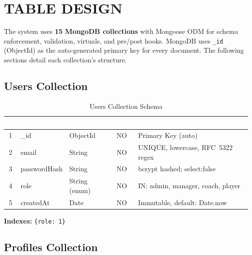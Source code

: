 \documentclass[12pt,a4paper,oneside]{report}
\begin{document}
\chapter{TABLE DESIGN}

The system uses \textbf{15 MongoDB collections} with Mongoose ODM for schema enforcement, validation, virtuals, and pre/post hooks. MongoDB uses \texttt{\_id} (ObjectId) as the auto-generated primary key for every document. The following sections detail each collection's structure.

\section{Users Collection}

\begin{table}[H]
\centering
\caption{Users Collection Schema}
\label{tab:users}
\small
\begin{tabularx}{\textwidth}{|c|l|l|l|X|}
\hline
\rowcolor{tableHeader}
\textcolor{white}{\#} & \textcolor{white}{\textbf{Field}} & \textcolor{white}{\textbf{Type}} & \textcolor{white}{\textbf{Null}} & \textcolor{white}{\textbf{Constraints}} \\
\hline
1 & \_id           & ObjectId         & NO  & Primary Key (auto) \\
\hline\rowcolor{tableRow}
2 & email          & String           & NO  & UNIQUE, lowercase, RFC~5322 regex \\
\hline
3 & passwordHash   & String           & NO  & bcrypt hashed; select:false \\
\hline\rowcolor{tableRow}
4 & role           & String (enum)    & NO  & IN: admin, manager, coach, player \\
\hline
5 & createdAt      & Date             & NO  & Immutable, default: Date.now \\
\hline
\end{tabularx}
\end{table}

\noindent\textbf{Indexes:} \texttt{\{role: 1\}}

\section{Profiles Collection}
\end{document}
